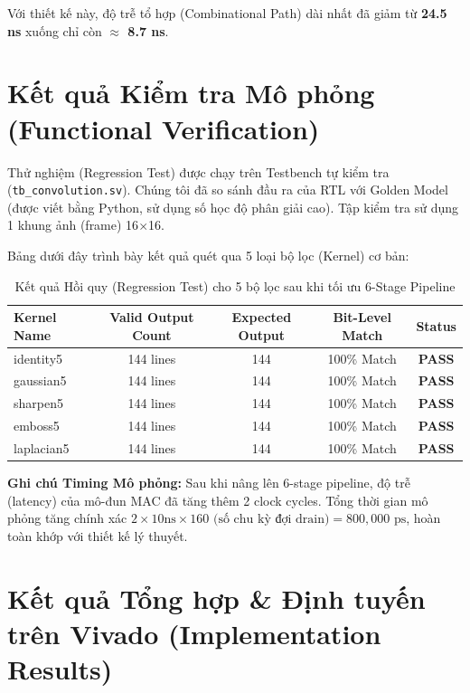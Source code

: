 \documentclass[a4paper,12pt]{article}
\begin{document}
Với thiết kế này, độ trễ tổ hợp (Combinational Path) dài nhất đã giảm từ \textbf{24.5 ns} xuống chỉ còn \textbf{$\approx$ 8.7 ns}.

\section{Kết quả Kiểm tra Mô phỏng (Functional Verification)}

Thử nghiệm (Regression Test) được chạy trên Testbench tự kiểm tra (\texttt{tb\_convolution.sv}). Chúng tôi đã so sánh đầu ra của RTL với Golden Model (được viết bằng Python, sử dụng số học độ phân giải cao). Tập kiểm tra sử dụng 1 khung ảnh (frame) 16$\times$16.

Bảng dưới đây trình bày kết quả quét qua 5 loại bộ lọc (Kernel) cơ bản:

\begin{table}[H]
    \centering
    \begin{tabularx}{\textwidth}{|X|c|c|c|>{\bfseries}c|}
    \hline
    \textbf{Kernel Name} & \textbf{Valid Output Count} & \textbf{Expected Output} & \textbf{Bit-Level Match} & \textbf{Status} \\ \hline
    identity5 & 144 lines & 144 & 100\% Match & \textcolor{green!70!black}{PASS} \\ \hline
    gaussian5 & 144 lines & 144 & 100\% Match & \textcolor{green!70!black}{PASS} \\ \hline
    sharpen5 & 144 lines & 144 & 100\% Match & \textcolor{green!70!black}{PASS} \\ \hline
    emboss5 & 144 lines & 144 & 100\% Match & \textcolor{green!70!black}{PASS} \\ \hline
    laplacian5 & 144 lines & 144 & 100\% Match & \textcolor{green!70!black}{PASS} \\ \hline
    \end{tabularx}
    \caption{Kết quả Hồi quy (Regression Test) cho 5 bộ lọc sau khi tối ưu 6-Stage Pipeline}
\end{table}

\textbf{Ghi chú Timing Mô phỏng:} Sau khi nâng lên 6-stage pipeline, độ trễ (latency) của mô-đun MAC đã tăng thêm 2 clock cycles. Tổng thời gian mô phỏng tăng chính xác $2 \times 10 \text{ns} \times 160 \text{ (số chu kỳ đợi drain)} = 800,000 \text{ ps}$, hoàn toàn khớp với thiết kế lý thuyết.

\section{Kết quả Tổng hợp \& Định tuyến trên Vivado (Implementation Results)}
\end{document}
